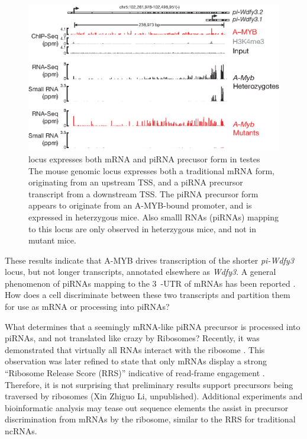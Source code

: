     \begin{figure} %
      \centering 
      \includegraphics{Figures/Discussion/pi-wdfy3.eps}
      \caption[\wdfy{} locus expresses both mRNA and piRNA precusor form in testes]
      {\wdfy{} locus expresses both mRNA and piRNA precusor form in testes\\[0.25cm]
        The mouse genomic locus \wdfy{} expresses both a traditional mRNA form, originating from an upstream TSS, and a piRNA precursor transcript from a downstream TSS. The piRNA precursor form appears to originate from an A-MYB-bound promoter, and is expressed in \amyb{} heterzygous mice. Also smalll RNAs (piRNAs) mapping to this locus are only observed in \amyb{} heterzygous mice, and not in \amyb{} mutant mice.
        }
      \label{Disc:fig:wdfy3}
      \end{figure}

    These results indicate that A-MYB drives transcription of the shorter \textit{pi-Wdfy3} locus, but not longer transcripts, annotated elsewhere as \textit{Wdfy3}. A general phenomenon of piRNAs mapping to the 3\textprime~-UTR of mRNAs has been reported \citep{Robine2009}. How does a cell discriminate between these two transcripts and partition them for use as mRNA or processing into piRNAs?

    What determines that a seemingly mRNA-like piRNA precursor is processed into piRNAs, and not translated like crazy by Ribosomes? Recently, it was demonstrated that virtually all RNAs interact with the ribosome \citep{Ingolia2011}. This observation was later refined to state that only mRNAs display a strong ``Ribosome Release Score (RRS)'' indicative of read-frame engagement \citep{Guttman2013}. Therefore, it is not surprising that preliminary results support precursors being traversed by ribosomes (Xin Zhiguo Li, unpublished). Additional experiments and bioinformatic analysis may tease out sequence elements the assist in precursor discrimination from mRNAs by the ribosome, similar to the RRS for traditional ncRNAs.

